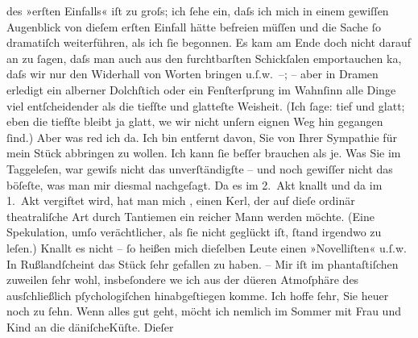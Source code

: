 \begin{ledgroupsized}[t]{13cm}
               des »erſten Einfalls« iſt zu groſs; ich ſehe ein, daſs ich {\pb}mich in einem gewiſſen Augenblick von dieſem
               erſten Einfall hätte befreien \introOben{}müſſen\introOben{} und die Sache ſo
               dramatiſch weiterführen, als ich ſie begonnen. Es kam am Ende doch nicht darauf an zu
               ſagen, daſs man auch aus den furchtbarſten Schickſalen emportauchen ka{\geminationn}, daſs wir nur den Widerhall von Worten bringen
               u.ſ.w. –; – aber in Dramen erledigt ein alberner Dolchſtich {\pb}oder ein Fenſterſprung im Wahnſinn alle Dinge viel
               entſcheidender als die tiefſte und glatteſte Weisheit. (Ich ſage: tief und glatt;
               eben die tiefſte bleibt ja glatt, we{\geminationn} wir nicht unſern
               eignen Weg hin gegangen ſind.) Aber was red ich da. Ich bin entfernt davon, Sie von
               Ihrer Sympathie für mein Stück abbringen zu wollen. Ich kann ſie beſſer brauchen als
               je. Was Sie im Taggeleſen, war {\pb}gewiſs nicht das unverſtändigſte – und noch
               gewiſſer nicht das böſeſte, was man mir diesmal nachgeſagt. Da es im 2. Akt knallt
               und da im 1. Akt vergiftet wird, hat man mich \label{K_L01590_1v}\label{K_L01590_1h}, einen Kerl, der auf dieſe ordinär
               theatraliſche Art durch Tantiemen ein reicher Mann werden möchte. (Eine Spekulation,
               umſo verächtlicher, als ſie nicht geglückt iſt, ſtand irgendwo zu {\pb}leſen.) Knallt es nicht – ſo heißen mich dieſelben
               Leute einen »Novelliſten« u.ſ.w. In Rußlandſcheint das Stück ſehr gefallen zu haben. – Mir iſt
               im phantaſtiſchen zuweilen ſehr wohl, insbeſondere we{\geminationn}
               ich aus der dü{\geminationn}eren Atmoſphäre des ausſchließlich
               pſychologiſchen hinabgeſtiegen komme.\pend
           \pstart
           Ich hoffe ſehr, Sie heuer noch zu ſehn. Wenn alles gut geht, möcht ich nemlich im
               Sommer mit Frau und Kind an die däniſcheKüſte. Dieſer \label{K_L01590_2v}
\end{ledgroupsized}
